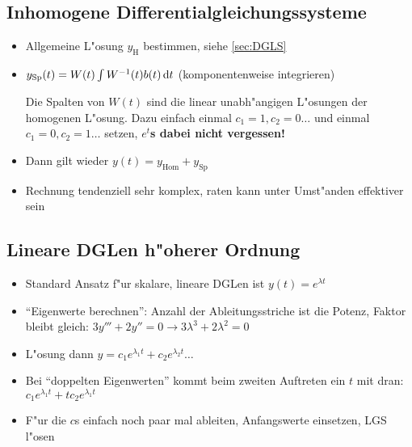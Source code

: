 \documentclass[fleqn,12pt]{scrartcl}
\newcommand{\id}{\, \mathrm{d}}
\newcommand{\intl}{\int\displaylimits}
\begin{document}
		\subsection{Inhomogene Differentialgleichungssysteme}
		\begin{itemize}
			\item
				Allgemeine L"osung $y_\text{H}$ bestimmen, siehe \autoref{sec:DGLS}
			\item
				$y_\text{Sp}(t) = W(t) \intl W^{-1}(t)b(t) \id t$ (komponentenweise integrieren)

				Die Spalten von $W(t)$ sind die linear unabh"angigen L"osungen der homogenen L"osung. Dazu einfach einmal $c_1 = 1, c_2 = 0 \dots$ und einmal $c_1 = 0, c_2 =1 \dots$ setzen, \textbf{$e^t$s dabei nicht vergessen!}

			\item Dann gilt wieder $y(t) = y_\text{Hom} + y_\text{Sp}$

			\item
				Rechnung tendenziell sehr komplex, raten kann unter Umst"anden effektiver sein
		\end{itemize}

		\subsection{Lineare DGLen h"oherer Ordnung}
		\begin{itemize}
			\item
				Standard Ansatz f"ur skalare, lineare DGLen ist $y(t) = e^{\lambda t}$
			\item
				\enquote{Eigenwerte berechnen}: Anzahl der Ableitungsstriche ist die Potenz, Faktor bleibt gleich: $3y''' + 2y'' = 0 \rightarrow 3\lambda^3 + 2 \lambda^2 = 0$
			\item
				L"osung dann $y = c_1e^{\lambda_1 t} + c_2 e^{\lambda_2 t} \dots$
			\item
				Bei \enquote{doppelten Eigenwerten} kommt beim zweiten Auftreten ein $t$ mit dran: $c_1 e^{\lambda_1 t} + tc_2e^{\lambda_1 t}$
			\item
				F"ur die $c$s einfach noch paar mal ableiten, Anfangswerte einsetzen, LGS l"osen

		\end{itemize}
\end{document}
